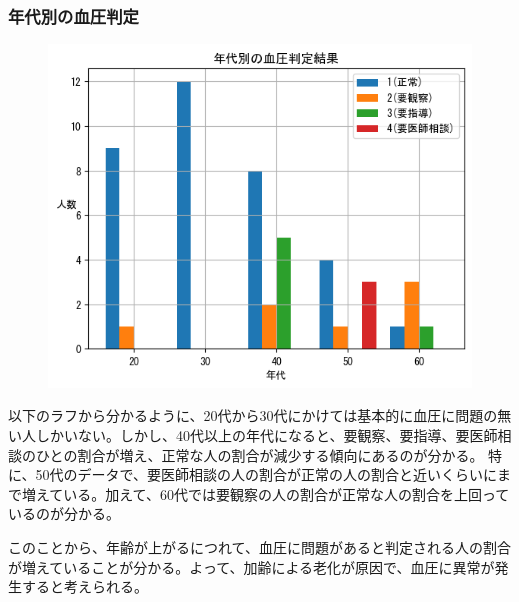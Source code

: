 \documentclass[dvipdfmx]{jsarticle}
\begin{document}
    \subsubsection{年代別の血圧判定}
    \begin{figure}[H]
        \centering
        \includegraphics[scale=0.7]{images/allgender/age_bldPrs_result.png}
    \end{figure}

        以下のラフから分かるように、20代から30代にかけては基本的に血圧に問題の無い人しかいない。しかし、40代以上の年代になると、要観察、要指導、要医師相談のひとの割合が増え、正常な人の割合が減少する傾向にあるのが分かる。
        特に、50代のデータで、要医師相談の人の割合が正常の人の割合と近いくらいにまで増えている。加えて、60代では要観察の人の割合が正常な人の割合を上回っているのが分かる。\par 
        このことから、年齢が上がるにつれて、血圧に問題があると判定される人の割合が増えていることが分かる。よって、加齢による老化が原因で、血圧に異常が発生すると考えられる。
\end{document}
